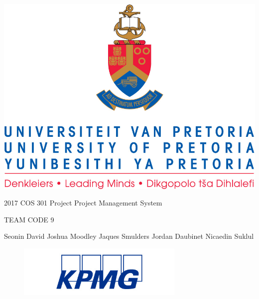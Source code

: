 \documentclass[a4paper,12pt]{article}
\begin{document}
\begin{center}
	\includegraphics{Graphics/uplogo.jpg}
	
	{\Huge 
		2017 COS 301 Project \linebreak
		Project Management System \linebreak 
		\par}
	
	{\Huge
		TEAM CODE 9
		\linebreak
		\par}
	
	\begin{LARGE}
		Seonin David
		\linebreak
		\linebreak
		Joshua Moodley
		\linebreak
		\linebreak
		Jaques Smulders
		\linebreak
		\linebreak
		Jordan Daubinet
		\linebreak
		\linebreak
		Nicaedin Suklul
	\end{LARGE}
\end{center}

\begin{figure}[b]
	\centering
	\includegraphics[width=8cm]{Graphics/kpmgLogo.jpg}
\end{figure}
\end{document}
